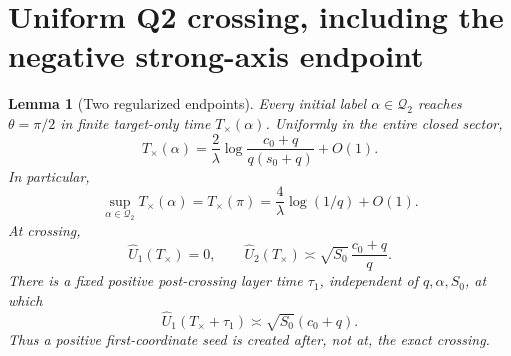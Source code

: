 \documentclass[11pt]{article}
\newtheorem{lemma}[theorem]{Lemma}\newtheorem{proposition}[theorem]{Proposition}
\theoremstyle{remark}\newtheorem{remark}[theorem]{Remark}
\newcommand{\Qtwo}{\mathcal Q_2}
\begin{document}
\section{Uniform Q2 crossing, including the negative strong-axis endpoint}
\begin{lemma}[Two regularized endpoints]\label{inc:AN02:q2completion:v1:crossing}
Every initial label $\alpha\in\Qtwo$ reaches $\theta=\pi/2$ in finite target-only time $T_\times(\alpha)$. Uniformly in the entire closed sector,
\begin{equation}\label{inc:AN02:q2completion:v1:crossclock}
 T_\times(\alpha)=\frac2\lambda
       \log\frac{c_0+q}{q(s_0+q)}+O(1).
\end{equation}
In particular,
\[
 \sup_{\alpha\in\Qtwo}T_\times(\alpha)
       =T_\times(\pi)=\frac4\lambda\log(1/q)+O(1).
\]
At crossing,
\begin{equation}\label{inc:AN02:q2completion:v1:crossamplitude}
 \widehat U_1(T_\times)=0,\qquad
 \widehat U_2(T_\times)\asymp\sqrt{S_0}\,\frac{c_0+q}{q}.
\end{equation}
There is a fixed positive post-crossing layer time $\tau_1$, independent of $q,\alpha,S_0$, at which
\[
 \widehat U_1(T_\times+\tau_1)\asymp\sqrt{S_0}(c_0+q).
\]
Thus a positive first-coordinate seed is created \emph{after}, not at, the exact crossing.
\end{lemma}
\end{document}
